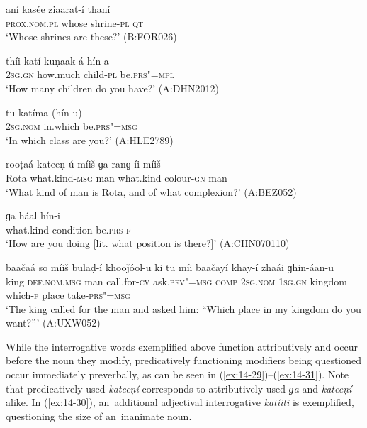 \begin{exe}
\ex
\label{ex:14-23}
\gll aní kasée ziaarat-í thaní \\
\textsc{prox.nom.pl} whose shrine-\textsc{pl} \textsc{qt} \\
\glt `Whose shrines are these?' (B:FOR026)

\ex
\label{ex:14-24}
\gll thíi katí kuṇaak-á hín-a \\
\textsc{2sg.gn} how.much child-\textsc{pl} be.\textsc{prs"=mpl} \\
\glt `How many children do you have?' (A:DHN2012)

\ex
\label{ex:14-25}
\gll tu katíma (hín-u) \\
\textsc{2sg.nom} in.which be.\textsc{prs"=msg} \\
\glt `In which class are you?' (A:HLE2789)

\ex
\label{ex:14-26}
\gll rooṭaá kateeṇ-ú míiš ɡa ranɡ-íi  míiš \\
Rota what.kind-\textsc{msg} man what.kind colour-\textsc{gn} man  \\
\glt `What kind of man is Rota, and of what complexion?' (A:BEZ052)

\ex
\label{ex:14-27}
\gll ɡa háal hín-i \\
what.kind condition be.\textsc{prs-f} \\
\glt `How are you doing [lit. what position is there?]' (A:CHN070110)

\ex
\label{ex:14-28}
\gll baačaá so míiš bulaḍ-í khooǰóol-u  ki tu míi baačayí khay-í zhaái ɡhin-áan-u \\
king \textsc{def.nom.msg} man call.for-\textsc{cv} ask.\textsc{pfv"=msg} \textsc{comp} \textsc{2sg.nom} \textsc{1sg.gn} kingdom which-\textsc{f} place take-\textsc{prs"=msg}  \\
\glt `The king called for the man and asked him: ``Which place in my kingdom do you want?''' (A:UXW052)
\end{exe}

While the interrogative words exemplified above function attributively and occur before the noun they modify, predicatively functioning modifiers being questioned occur immediately preverbally, as can be seen in (\ref{ex:14-29})--(\ref{ex:14-31}). Note that predicatively used \textit{kateeṇí} corresponds to attributively used \textit{ɡa} and \textit{kateeṇí} alike. In (\ref{ex:14-30}), an~additional adjectival interrogative \textit{katíiti} is exemplified, questioning the size of an~inanimate noun.

